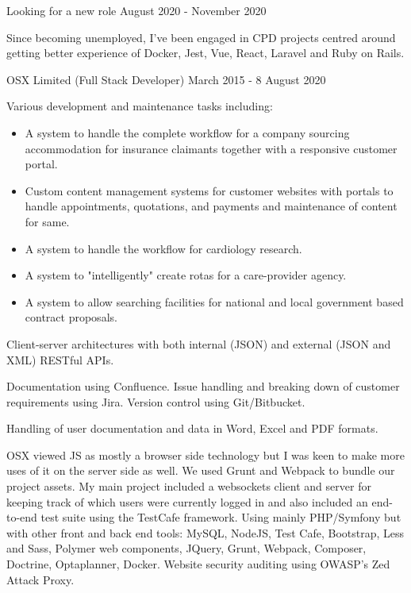
\jobHeading
    {Looking for a new role}
    {August 2020 - November 2020}

Since becoming unemployed, I've been engaged in CPD projects centred around
getting better experience of Docker, Jest, Vue, React, Laravel and
Ruby on Rails.

\jobHeading
    {OSX Limited (Full Stack Developer)}
    {March 2015 - 8 August 2020}

Various development and maintenance tasks including:
\begin{itemize}
    \item A system to handle the complete workflow for a company sourcing accommodation for insurance claimants together with a responsive customer portal.
    \item Custom content management systems for customer websites with portals to handle appointments, quotations, and payments and maintenance of content for same.
    \item A system to handle the workflow for cardiology research.
    \item A system to "intelligently" create rotas for a care-provider agency.
    \item A system to allow searching facilities for national and local government based contract proposals.
\end{itemize}

Client-server architectures with both
internal (JSON) and external (JSON and XML) RESTful APIs.

Documentation using Confluence. Issue handling and breaking down
of customer requirements using Jira. Version control using Git/Bitbucket.

Handling of user documentation and data in Word, Excel and PDF formats.


\ifnum{}
    OSX viewed JS as mostly a browser side technology
    but I was keen to make more uses of it on the server side as well.
    We used Grunt and Webpack to bundle our project assets.
    My main project included a websockets client and server
    for keeping track of which users were currently logged in
    and also included an end-to-end test suite
    using the TestCafe framework.
\else
    Using mainly PHP/Symfony but with other front and back end tools:
    MySQL, NodeJS, Test Cafe, Bootstrap, Less and Sass,
    Polymer web components, JQuery, Grunt, Webpack, Composer,
    Doctrine, Optaplanner, Docker.
    Website security auditing using OWASP's Zed Attack Proxy.
\fi

